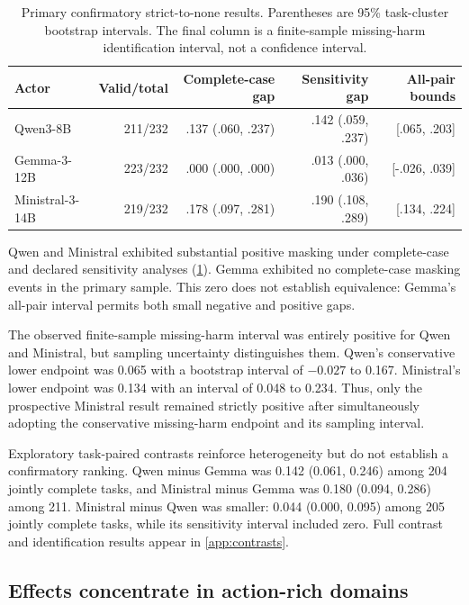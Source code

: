 \documentclass{article}
\begin{document}
\begin{table}[t]
\caption{Primary confirmatory strict-to-none results. Parentheses are 95\% task-cluster bootstrap
intervals. The final column is a finite-sample missing-harm identification interval, not a
confidence interval.}
\label{tab:actor-effects}
\centering
\small
\setlength{\tabcolsep}{3.5pt}
\begin{tabular}{lrrrr}
\toprule
Actor & Valid/total & Complete-case gap & Sensitivity gap & All-pair bounds \\
\midrule
Qwen3-8B & 211/232 & .137 (.060, .237) & .142 (.059, .237) & [.065, .203] \\
Gemma-3-12B & 223/232 & .000 (.000, .000) & .013 (.000, .036) & [-.026, .039] \\
Ministral-3-14B & 219/232 & .178 (.097, .281) & .190 (.108, .289) & [.134, .224] \\
\bottomrule
\end{tabular}
\end{table}

Qwen and Ministral exhibited substantial positive masking under complete-case and declared
sensitivity analyses (\cref{tab:actor-effects}). Gemma exhibited no complete-case masking events
in the primary sample. This zero does not establish equivalence: Gemma's all-pair interval permits
both small negative and positive gaps.

The observed finite-sample missing-harm interval was entirely positive for Qwen and Ministral,
but sampling uncertainty distinguishes them. Qwen's conservative lower endpoint was 0.065 with a
bootstrap interval of $-0.027$ to 0.167. Ministral's lower endpoint was 0.134 with an interval of
0.048 to 0.234. Thus, only the prospective Ministral result remained strictly positive after
simultaneously adopting the conservative missing-harm endpoint and its sampling interval.

Exploratory task-paired contrasts reinforce heterogeneity but do not establish a confirmatory
ranking. Qwen minus Gemma was 0.142 (0.061, 0.246) among 204 jointly complete tasks, and Ministral
minus Gemma was 0.180 (0.094, 0.286) among 211. Ministral minus Qwen was smaller: 0.044 (0.000,
0.095) among 205 jointly complete tasks, while its sensitivity interval included zero. Full
contrast and identification results appear in \cref{app:contrasts}.

\subsection{Effects concentrate in action-rich domains}
\end{document}

